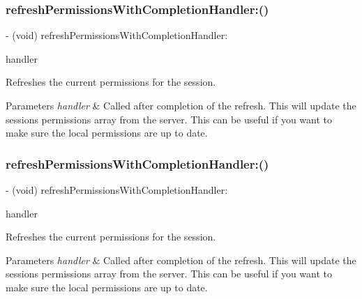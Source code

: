 \subsubsection{\texorpdfstring{refresh\+Permissions\+With\+Completion\+Handler\+:()}{refreshPermissionsWithCompletionHandler:()}\hspace{0.1cm}{\footnotesize\ttfamily [2/5]}}
{\footnotesize\ttfamily -\/ (void) refresh\+Permissions\+With\+Completion\+Handler\+: \begin{DoxyParamCaption}\item[{(F\+B\+Session\+Request\+Permission\+Result\+Handler)}]{handler }\end{DoxyParamCaption}}

Refreshes the current permissions for the session. 
\begin{DoxyParams}{Parameters}
{\em handler} & Called after completion of the refresh.  This will update the sessions\textquotesingle{} permissions array from the server. This can be useful if you want to make sure the local permissions are up to date. \\
\hline
\end{DoxyParams}
\mbox{\label{interfaceFBSession_a569f5daa686e4593bd0d5e68016a15a0}} 
\subsubsection{\texorpdfstring{refresh\+Permissions\+With\+Completion\+Handler\+:()}{refreshPermissionsWithCompletionHandler:()}\hspace{0.1cm}{\footnotesize\ttfamily [3/5]}}
{\footnotesize\ttfamily -\/ (void) refresh\+Permissions\+With\+Completion\+Handler\+: \begin{DoxyParamCaption}\item[{(F\+B\+Session\+Request\+Permission\+Result\+Handler)}]{handler }\end{DoxyParamCaption}}

Refreshes the current permissions for the session. 
\begin{DoxyParams}{Parameters}
{\em handler} & Called after completion of the refresh.  This will update the sessions\textquotesingle{} permissions array from the server. This can be useful if you want to make sure the local permissions are up to date. \\
\hline
\end{DoxyParams}
\mbox{\label{interfaceFBSession_a569f5daa686e4593bd0d5e68016a15a0}} 
